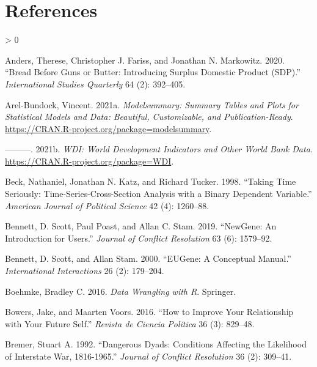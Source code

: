 \documentclass[
  11pt,
]{article}
\newlength{\cslhangindent}
\newenvironment{CSLReferences}[2] %
 {%
  \setlength{\parindent}{0pt}
  \ifodd #1 \everypar{\setlength{\hangindent}{\cslhangindent}}\ignorespaces\fi
  \ifnum #2 > 0
  \setlength{\parskip}{#2\baselineskip}
  \fi
 }%
 {}
\begin{document}
\newpage

\hypertarget{references}{%
\section{References}\label{references}}

\setlength{\parskip}{6pt}

\hypertarget{refs}{}
\begin{CSLReferences}{1}{0}
\leavevmode\hypertarget{ref-andersetal2020bbgb}{}%
Anders, Therese, Christopher J. Fariss, and Jonathan N. Markowitz. 2020. {``Bread Before Guns or Butter: Introducing Surplus Domestic Product (SDP).''} \emph{International Studies Quarterly} 64 (2): 392--405.

\leavevmode\hypertarget{ref-arelbundock2021m}{}%
Arel-Bundock, Vincent. 2021a. \emph{Modelsummary: Summary Tables and Plots for Statistical Models and Data: Beautiful, Customizable, and Publication-Ready}. \url{https://CRAN.R-project.org/package=modelsummary}.

\leavevmode\hypertarget{ref-arelbundock2021w}{}%
---------. 2021b. \emph{WDI: World Development Indicators and Other World Bank Data}. \url{https://CRAN.R-project.org/package=WDI}.

\leavevmode\hypertarget{ref-becketal1998tts}{}%
Beck, Nathaniel, Jonathan N. Katz, and Richard Tucker. 1998. {``Taking Time Seriously: Time-Series-Cross-Section Analysis with a Binary Dependent Variable.''} \emph{American Journal of Political Science} 42 (4): 1260--88.

\leavevmode\hypertarget{ref-bennettetal2019n}{}%
Bennett, D. Scott, Paul Poast, and Allan C. Stam. 2019. {``NewGene: An Introduction for Users.''} \emph{Journal of Conflict Resolution} 63 (6): 1579--92.

\leavevmode\hypertarget{ref-bennettstam2000e}{}%
Bennett, D. Scott, and Allan Stam. 2000. {``EUGene: A Conceptual Manual.''} \emph{International Interactions} 26 (2): 179--204.

\leavevmode\hypertarget{ref-boehmke2016dwr}{}%
Boehmke, Bradley C. 2016. \emph{Data Wrangling with {R}}. Springer.

\leavevmode\hypertarget{ref-bowersvoors2016hiyr}{}%
Bowers, Jake, and Maarten Voors. 2016. {``How to Improve Your Relationship with Your Future Self.''} \emph{Revista de Ciencia Politica} 36 (3): 829--48.

\leavevmode\hypertarget{ref-bremer1992ddc}{}%
Bremer, Stuart A. 1992. {``Dangerous Dyads: Conditions Affecting the Likelihood of Interstate War, 1816-1965.''} \emph{Journal of Conflict Resolution} 36 (2): 309--41.


\end{CSLReferences}
\end{document}

